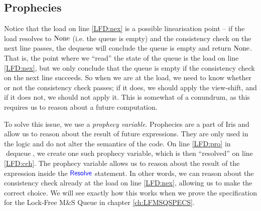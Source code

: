 \documentclass[a4paper, 10pt]{report}
\theoremstyle{definition}
\newcommand{\dequeue}{\operatorname{dequeue}}
\newcommand{\msq}{M\&S Queue}
\newcommand{\lfmsq}{Lock-Free \msq{}}
\begin{document}
\subsection{Prophecies}
Notice that the load on line \ref{LFD:nex} is a possible linearisation point -- if the load resolves to $\operatorname{None}$ (i.e. the queue is empty) and the consistency check on the next line passes, the dequeue will conclude the queue is empty and return $\operatorname{None}$. That is, the point where we ``read'' the state of the queue is the load on line \ref{LFD:nex}, but we only conclude that the queue is empty if the consistency check on the next line succeeds. So when we are at the load, we need to know whether or not the consistency check passes; if it does, we should apply the view-shift, and if it does not, we should not apply it. This is somewhat of a conundrum, as this requires us to reason about a future computation.

To solve this issue, we use a \textit{prophecy variable}. Prophecies are a part of Iris \citep{DBLP:journals/pacmpl/JungLPRTDJ20} and allow us to reason about the result of future expressions. They are only used in the logic and do not alter the semantics of the code. On line \ref{LFD:pro} in $\dequeue$, we create one such prophecy variable, which is then ``resolved'' on line \ref{LFD:cch}. The prophecy variable allows us to reason about the result of the expression inside the $\textsf{\color{blue} Resolve}$ statement. In other words, we can reason about the consistency check already at the load on line \ref{LFD:nex}, allowing us to make the correct choice. We will see exactly how this works when we prove the specification for the \lfmsq{} in chapter \ref{ch:LFMSQSPECS}.
\end{document}
